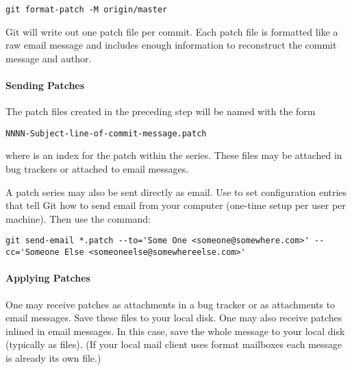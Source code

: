 \begin{verbatim}
git format-patch -M origin/master
\end{verbatim}

Git will write out one patch file per commit. Each patch file is formatted like
a raw email message and includes enough information to reconstruct the commit
message and author.


\paragraph{Sending Patches}
\label{par:SendingPatches}

The patch files created in the preceding step will be named with the form

\begin{verbatim}
NNNN-Subject-line-of-commit-message.patch
\end{verbatim}

where  is an index for the patch within the series. These files may
be attached in bug trackers or attached to email messages.

A patch series may also be sent directly as email. Use
 to set  configuration entries that
tell Git how to send email from your computer (one-time setup per user per
machine). Then use the  command:

\begin{verbatim}
git send-email *.patch --to='Some One <someone@somewhere.com>' --cc='Someone Else <someoneelse@somewhereelse.com>'
\end{verbatim}


\paragraph{Applying Patches}
\label{par:ApplyingPatches}

One may receive patches as attachments in a bug tracker or as attachments to
email messages. Save these files to your local disk. One may also receive
patches inlined in email messages. In this case, save the whole message to your
local disk (typically as  files). (If your local mail client uses
 format mailboxes each message is already its own file.)


